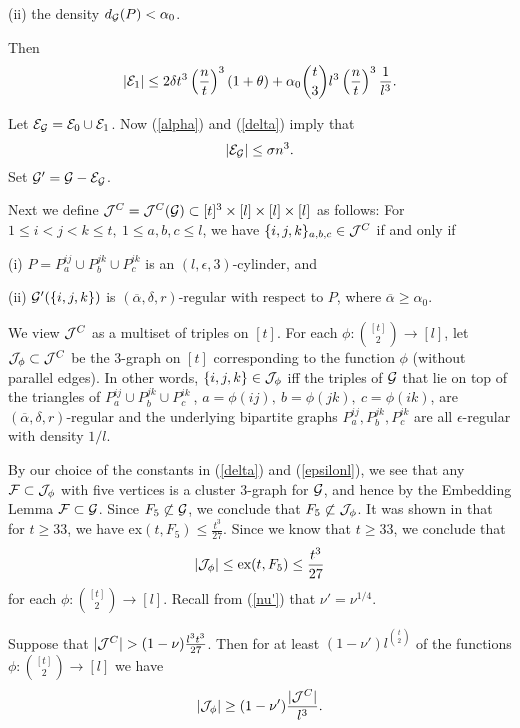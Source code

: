 \documentclass[11pt]{article}
\begin{document}
  (ii) the density $d_{{{\cal G}}}(P)<\alpha_0$.

 Then
 $$|{\cal E}_1|\le 2\delta t^3\left(\frac{n}{t}\right)^3(1+\theta) +\alpha_0
 {t \choose 3}l^3\left(\frac{n}{t}\right)^3 \frac{1}{l^3}.$$


  Let ${\cal E}_{{{\cal G}}}={\cal E}_0\cup {\cal E}_1$.
  Now (\ref{alpha}) and (\ref{delta}) imply that
$$|{\cal E}_{{{\cal G}}}|\le \sigma n^3.$$
Set ${{\cal G}}'={{\cal G}}-{\cal E}_{{{\cal G}}}$.

Next we define ${\cal J}^C={\cal J}^C({{\cal G}})\subset [t]^3 \times [l] \times [l] \times [l]$ as follows:
 For $1 \le i <j <k \le t,\  1 \le a,b,c \le l$,  we have $\{i,j,k\}_{a,b,c} \in {\cal J}^C$ if and only if

(i) $P=P_a^{ij} \cup P_b^{jk} \cup P_c^{ik}$ is an $(l, \epsilon,
3)$-cylinder, and

(ii) ${{\cal G}}'(\{i,j,k\})$ is $(\overline{\alpha}, \delta, r)$-regular with respect to $P$, where
 $\overline{\alpha}\ge \alpha_0$.

We view ${\cal J}^C$ as a multiset of triples on $[t]$. For each
$\phi:{[t]\choose 2} \rightarrow [l]$, let ${\cal J}_{\phi}\subset {\cal J}^C$ be the
$3$-graph on $[t]$ corresponding to the function $\phi$ (without
parallel edges).  In other words, $\{i,j,k\} \in {\cal J}_{\phi}$ iff the triples of ${{\cal G}}$
that lie on top of the triangles of $P_{a}^{ij} \cup P_{b}^{jk} \cup
P_{c}^{ik}\ $, $a=\phi(ij),\  b=\phi(jk),\ c=\phi(ik)$,
 are $(\overline{\alpha}, \delta, r)$-regular and the underlying bipartite graphs $P_{a}^{ij}, P_{b}^{jk}, P_{c}^{ik}$
 are all $\epsilon$-regular with density $1/l$.

By our choice of the constants in (\ref{delta}) and (\ref{epsilonl}),
 we see that any ${\cal F}\subset {\cal J}_{\phi}$ with five vertices is a cluster $3$-graph for ${{\cal G}}$, and hence by the Embedding Lemma ${\cal F} \subset {{\cal G}}$.
 Since $F_5 \not\subset {{\cal G}}$, we conclude that $F_5 \not\subset {\cal J}_{\phi}$.
  It was shown in \cite{KM} that for $t \ge 33$, we have ex$(t, F_5)\le \frac{t^3}{27}$.
  Since we know  that $t \ge 33$, we conclude that
  $$|{\cal J}_{\phi}|\le \hbox{ex} (t, F_5) \le \frac{t^3}{27}$$ for each $\phi :{[t]\choose 2} \rightarrow [l]$.  Recall from (\ref{nu'}) that $\nu'=\nu^{1/4}$.

\begin{lemma}\label{markov}
 Suppose that $|\cJ^C|>(1-\nu)\frac{l^3t^3}{27}$. Then for at least $(1-\nu') l^{{t \choose 2}}$ of the
functions $\phi:{[t]\choose 2} \rightarrow [l]$ we have
$$|{\cal J}_{\phi}| \ge (1-\nu')\frac{|{\cal J}^C|}{l^3}.$$
\end{lemma}
\end{document}
